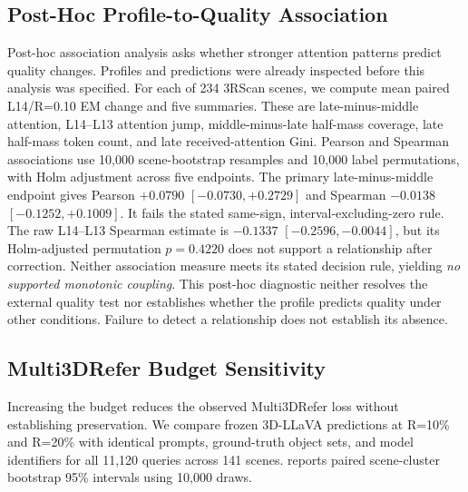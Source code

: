 \subsection{Post-Hoc Profile-to-Quality Association}
\label{sec:supp_coupling}
Post-hoc association analysis asks whether stronger attention patterns predict quality changes. Profiles and predictions were already inspected before this analysis was specified. For each of 234 3RScan scenes, we compute mean paired L14/R=0.10 EM change and five summaries. These are late-minus-middle attention, L14--L13 attention jump, middle-minus-late half-mass coverage, late half-mass token count, and late received-attention Gini. Pearson and Spearman associations use 10,000 scene-bootstrap resamples and 10,000 label permutations, with Holm adjustment across five endpoints. The primary late-minus-middle endpoint gives Pearson $+0.0790$ $[-0.0730,+0.2729]$ and Spearman $-0.0138$ $[-0.1252,+0.1009]$. It fails the stated same-sign, interval-excluding-zero rule. The raw L14--L13 Spearman estimate is $-0.1337$ $[-0.2596,-0.0044]$, but its Holm-adjusted permutation $p=0.4220$ does not support a relationship after correction. Neither association measure meets its stated decision rule, yielding \emph{no supported monotonic coupling}. This post-hoc diagnostic neither resolves the external quality test nor establishes whether the profile predicts quality under other conditions. Failure to detect a relationship does not establish its absence.

\subsection{Multi3DRefer Budget Sensitivity}
Increasing the budget reduces the observed Multi3DRefer loss without establishing preservation. We compare frozen 3D-LLaVA predictions at R=10\% and R=20\% with identical prompts, ground-truth object sets, and model identifiers for all 11,120 queries across 141 scenes.  reports paired scene-cluster bootstrap 95\% intervals using 10,000 draws.

\begin{table}[t]
\centering
\caption{Multi3DRefer budget sensitivity. Deltas are candidate minus reference in mIoU points on the inspected benchmark.}
\label{tab:supp_multi3drefer_budget}
\end{table}

